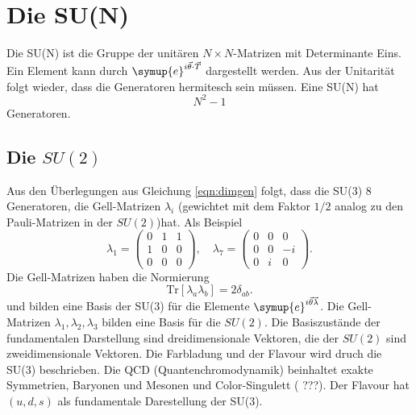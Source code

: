 \documentclass[
  captions=tableheading,  %
  titlepage=firstiscover, %
]{scrartcl}
\begin{document}
\section{Die SU(N)}
Die SU(N) ist die Gruppe der unitären $N \times N$-Matrizen mit Determinante Eins. 
Ein Element kann durch $\symup{e}^{i\vec{\theta} \cdot \vec{{T}}}$ dargestellt werden.
Aus der Unitarität folgt wieder, dass die Generatoren hermitesch sein müssen.
Eine SU(N) hat
\begin{equation}
  N^2 - 1 \label{eqn:dimgen}
\end{equation}
Generatoren.
\subsection{Die \texorpdfstring{$SU(2)$}{PDFstring}}
Aus den Überlegungen aus Gleichung \eqref{eqn:dimgen} folgt, dass die 
SU(3) 8 Generatoren, die Gell-Matrizen $\lambda_i$ (gewichtet mit dem Faktor $1/2$ analog 
zu den Pauli-Matrizen in der $SU(2)$)hat.
Als Beispiel
\begin{equation*}
  \lambda_1 = 
  \begin{pmatrix}
    0 & 1 & 1 \\
    1 & 0 & 0 \\ 
    0 & 0 & 0 
  \end{pmatrix} ,\quad 
  \lambda_7 = 
  \begin{pmatrix}
    0 & 0 & 0 \\
    0 & 0 & -i\\
    0 & i & 0
  \end{pmatrix}.
\end{equation*}
Die Gell-Matrizen haben die Normierung 
\begin{equation*}
  \text{Tr}[\lambda_a \lambda_b] = 2 \delta_{ab} .
\end{equation*}
und bilden eine Basis der SU(3) für die Elemente $\symup{e}^{i \vec{\theta} \vec{\lambda}}$.
Die Gell-Matrizen $\lambda_1, \lambda_2, \lambda_3$ bilden eine Basis für 
die $SU(2)$.
Die Basiszustände der fundamentalen Darstellung sind dreidimensionale Vektoren, die der $SU(2)$ sind 
zweidimensionale Vektoren.
Die Farbladung und der Flavour wird druch die SU(3) beschrieben.
Die QCD (Quantenchromodynamik) beinhaltet exakte Symmetrien, Baryonen und Mesonen und Color-Singulett ({\color{red} ???}).
Der Flavour hat $(u, d, s)$ als fundamentale Darestellung der SU(3).
\end{document}

